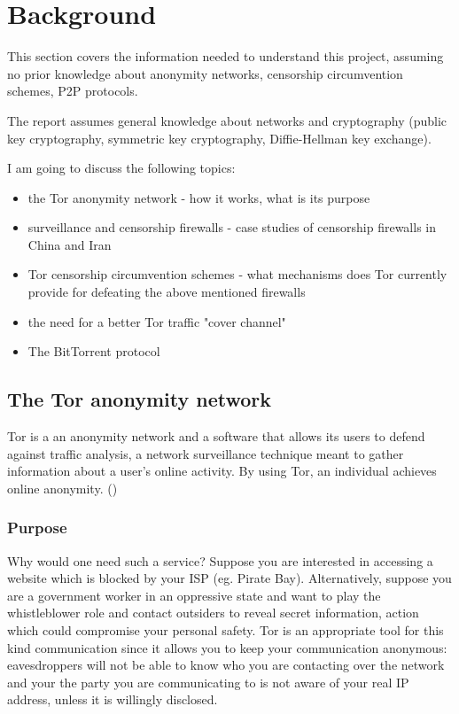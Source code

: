 \documentclass[11pt]{book} %
\begin{document}
\newpage
\section{Background}


This section covers the information needed to understand this project, assuming no prior knowledge about anonymity networks, censorship circumvention schemes, P2P protocols.

The report assumes general knowledge about networks and cryptography (public key cryptography, symmetric key cryptography, Diffie-Hellman key exchange).

I am going to discuss the following topics:

\begin{itemize}
\item the Tor anonymity network - how it works, what is its purpose
\item surveillance and censorship firewalls - case studies of censorship firewalls in China and Iran 
\item Tor censorship circumvention schemes - what mechanisms does Tor currently provide for defeating the above mentioned firewalls
\item the need for a better Tor traffic "cover channel"
\item The BitTorrent protocol
\end{itemize}

\subsection{The Tor anonymity network}
Tor is a an anonymity network and a software that allows its users to defend against traffic analysis, a network surveillance technique meant to gather information about a user’s online activity. By using Tor, an individual achieves online anonymity. (\citep*{web:torOverview})

\subsubsection{Purpose}
Why would one need such a service? Suppose you are interested in accessing a website which is blocked by your ISP (eg. Pirate Bay). Alternatively, suppose you are a government worker in an oppressive state and want to play the whistleblower role and contact outsiders to reveal secret information, action which could compromise your personal safety. Tor is an appropriate tool for this kind communication since it allows you to keep your communication anonymous: eavesdroppers will not be able to know who you are contacting over the network and your the party you are communicating to is not aware of your real IP address, unless it is willingly disclosed.
\end{document}

